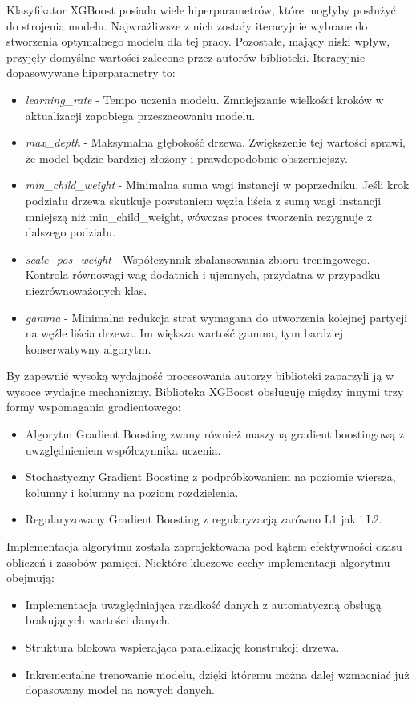 \documentclass[polish, twoside, 12pt, a4paper]{article}
\theoremstyle{definition}
\theoremstyle{plain}
\theoremstyle{remark}
\begin{document}
Klasyfikator XGBoost posiada wiele hiperparametrów, które mogłyby posłużyć do strojenia modelu. Najwrażliwsze z nich zostały iteracyjnie wybrane do stworzenia optymalnego modelu dla tej pracy. Pozostałe, mający niski wpływ, przyjęły domyślne wartości zalecone przez autorów biblioteki. Iteracyjnie dopasowywane hiperparametry to:
\begin{itemize}
 \item \emph{learning\_rate} - Tempo uczenia modelu. Zmniejszanie wielkości kroków w aktualizacji zapobiega przeszacowaniu modelu.
 \item \emph{max\_depth} - Maksymalna głębokość drzewa. Zwiększenie tej wartości sprawi, że model będzie bardziej złożony i prawdopodobnie obszerniejszy.
 \item \emph{min\_child\_weight} - Minimalna suma wagi instancji w poprzedniku. Jeśli krok podziału drzewa skutkuje powstaniem węzła liścia z sumą wagi instancji mniejszą niż min\_child\_weight, wówczas proces tworzenia rezygnuje z dalszego podziału. 
 \item \emph{scale\_pos\_weight} - Współczynnik zbalansowania zbioru treningowego. Kontrola równowagi wag dodatnich i ujemnych, przydatna w przypadku niezrównoważonych klas.
 \item \emph{gamma} - Minimalna redukcja strat wymagana do utworzenia kolejnej partycji na węźle liścia drzewa. Im większa wartość gamma, tym bardziej konserwatywny algorytm.
\end{itemize}

By zapewnić wysoką wydajność procesowania autorzy biblioteki zaparzyli ją w wysoce wydajne mechanizmy. Biblioteka XGBoost obsługuję między innymi trzy formy wspomagania gradientowego:
\begin{itemize}
  \item Algorytm Gradient Boosting zwany również maszyną gradient boostingową z uwzględnieniem współczynnika uczenia.
  \item Stochastyczny Gradient Boosting z podpróbkowaniem na poziomie wiersza, kolumny i kolumny na poziom rozdzielenia.
  \item Regularyzowany Gradient Boosting z regularyzacją zarówno L1 jak i L2.
\end{itemize}

Implementacja algorytmu została zaprojektowana pod kątem efektywności czasu obliczeń i zasobów pamięci. Niektóre kluczowe cechy implementacji algorytmu obejmują:
\begin{itemize}
 \item Implementacja uwzględniająca rzadkość danych z automatyczną obsługą brakujących wartości danych.
 \item Struktura blokowa wspierająca paralelizację konstrukcji drzewa.
 \item Inkrementalne trenowanie modelu, dzięki któremu można dalej wzmacniać już dopasowany model na nowych danych.
\end{itemize}
\end{document}
